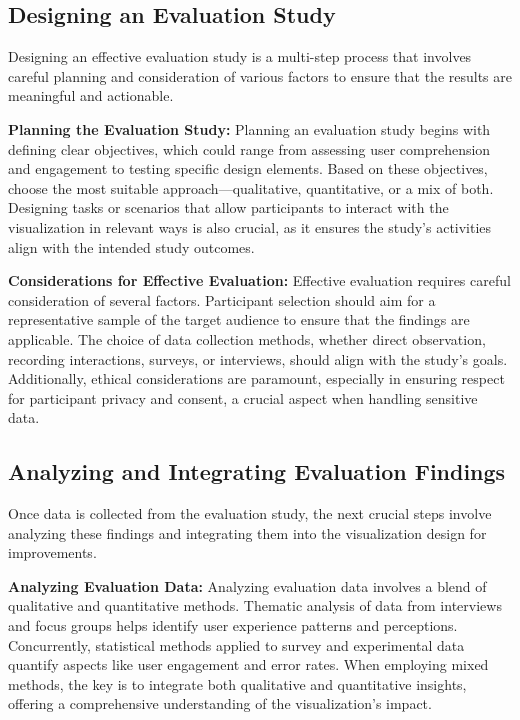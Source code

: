 \subsection{Designing an Evaluation Study}
Designing an effective evaluation study is a multi-step process that involves careful planning and consideration of various factors to ensure that the results are meaningful and actionable.

\textbf{Planning the Evaluation Study:}
Planning an evaluation study begins with defining clear objectives, which could range from assessing user comprehension and engagement to testing specific design elements. Based on these objectives, choose the most suitable approach—qualitative, quantitative, or a mix of both. Designing tasks or scenarios that allow participants to interact with the visualization in relevant ways is also crucial, as it ensures the study's activities align with the intended study outcomes.

\textbf{Considerations for Effective Evaluation:}
Effective evaluation requires careful consideration of several factors. Participant selection should aim for a representative sample of the target audience to ensure that the findings are applicable. The choice of data collection methods, whether direct observation, recording interactions, surveys, or interviews, should align with the study's goals. Additionally, ethical considerations are paramount, especially in ensuring respect for participant privacy and consent, a crucial aspect when handling sensitive data.

\subsection{Analyzing and Integrating Evaluation Findings}
Once data is collected from the evaluation study, the next crucial steps involve analyzing these findings and integrating them into the visualization design for improvements.

\textbf{Analyzing Evaluation Data:}
Analyzing evaluation data involves a blend of qualitative and quantitative methods. Thematic analysis of data from interviews and focus groups helps identify user experience patterns and perceptions. Concurrently, statistical methods applied to survey and experimental data quantify aspects like user engagement and error rates. When employing mixed methods, the key is to integrate both qualitative and quantitative insights, offering a comprehensive understanding of the visualization's impact.

